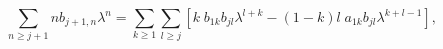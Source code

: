 \begin{equation}
\sum_{n\geq j+1} n b_{j+1, n}\lambda^{n}=\sum_{k\geq 1}\sum_{l\geq j} [k\;b_{1k}b_{jl} \lambda^{l+k}-(1-k)l\;a_{1k}b_{jl}\lambda^{k+l-1}],\label{a.20}
\end{equation}

